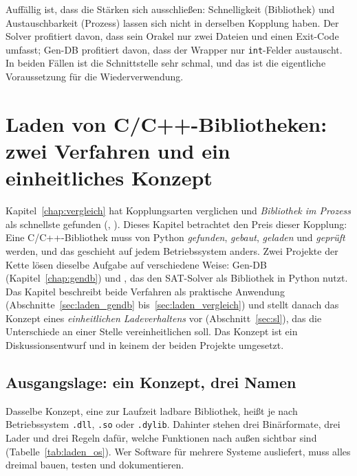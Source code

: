 Auffällig ist, dass die Stärken sich ausschließen: Schnelligkeit (Bibliothek) und Austauschbarkeit (Prozess) lassen sich nicht in derselben Kopplung haben. Der Solver profitiert davon, dass sein Orakel nur zwei Dateien und einen Exit-Code umfasst; Gen-DB profitiert davon, dass der Wrapper nur \texttt{int}-Felder austauscht. In beiden Fällen ist die Schnittstelle sehr schmal, und das ist die eigentliche Voraussetzung für die Wiederverwendung.

\chapter{Laden von C/C++-Bibliotheken: zwei Verfahren und ein einheitliches Konzept}
\label{chap:laden}

Kapitel~\ref{chap:vergleich} hat Kopplungsarten verglichen und \emph{Bibliothek im Prozess} als schnellste gefunden (, ). Dieses Kapitel betrachtet den Preis dieser Kopplung: Eine C/C++-Bibliothek muss von Python \emph{gefunden}, \emph{gebaut}, \emph{geladen} und \emph{geprüft} werden, und das geschieht auf jedem Betriebssystem anders. Zwei Projekte der Kette lösen dieselbe Aufgabe auf verschiedene Weise: Gen-DB (Kapitel~\ref{chap:gendb}) und , das den SAT-Solver als Bibliothek in Python nutzt. Das Kapitel beschreibt beide Verfahren als praktische Anwendung (Abschnitte~\ref{sec:laden_gendb} bis~\ref{sec:laden_vergleich}) und stellt danach das Konzept eines \emph{einheitlichen Ladeverhaltens} vor (Abschnitt~\ref{sec:sl}), das die Unterschiede an einer Stelle vereinheitlichen soll. Das Konzept ist ein Diskussionsentwurf und in keinem der beiden Projekte umgesetzt.

\section{Ausgangslage: ein Konzept, drei Namen}
\label{sec:laden_ausgangslage}

Dasselbe Konzept, eine zur Laufzeit ladbare Bibliothek, heißt je nach Betriebssystem \texttt{.dll}, \texttt{.so} oder \texttt{.dylib}. Dahinter stehen drei Binärformate, drei Lader und drei Regeln dafür, welche Funktionen nach außen sichtbar sind (Tabelle~\ref{tab:laden_os}). Wer Software für mehrere Systeme ausliefert, muss alles dreimal bauen, testen und dokumentieren.


